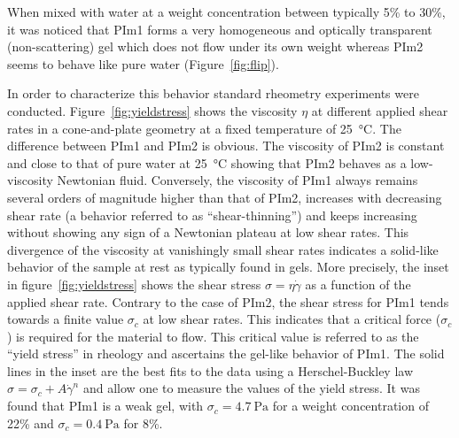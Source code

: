\documentclass[prl,a4paper,twocolumn,superscriptaddress,showkeys]{revtex4}
\begin{document}
When mixed with water at a weight concentration between typically 5\% to 30\%, it was noticed that PIm1 forms a very homogeneous and optically transparent (non-scattering) gel which does not flow under its own weight whereas PIm2 seems to behave like pure water (Figure~\ref{fig:flip}).

In order to characterize this behavior standard rheometry experiments were conducted. Figure~\ref{fig:yieldstress} shows the viscosity $\eta$ at different applied shear rates  in a cone-and-plate geometry at a fixed temperature of \SI{25}{\celsius}\cite{Macosko1994}. The difference between PIm1 and PIm2 is obvious. The viscosity of PIm2 is constant and close to that of pure water at \SI{25}{\celsius} showing that PIm2 behaves as a low-viscosity Newtonian fluid. Conversely, the viscosity of PIm1 always remains several orders of magnitude higher than that of PIm2, increases with decreasing shear rate (a behavior referred to as ``shear-thinning'') and keeps increasing without showing any sign of a Newtonian plateau at low shear rates. This divergence of the viscosity at vanishingly small shear rates indicates a solid-like behavior of the sample at rest as typically found in gels. More precisely, the inset in figure~\ref{fig:yieldstress} shows the shear stress $\sigma=\eta\dot{\gamma}$ as a function of the applied shear rate. Contrary to the case of PIm2, the shear stress for PIm1 tends towards a finite value $\sigma_c$ at low shear rates. This indicates that a critical force ($\sigma_c$) is required for the material to flow. This critical value is referred to as the ``yield stress'' in rheology\cite{Barnes1999} and ascertains the gel-like behavior of PIm1. The solid lines in the inset are the best fits to the data using a Herschel-Buckley law $\sigma = \sigma_c + A\dot{\gamma}^n$ and allow one to measure the values of the yield stress. It was found that PIm1 is a weak gel, with $\sigma_c = \SI{4.7}{\pascal}$ for a weight concentration of 22\% and $\sigma_c = \SI{0.4}{\pascal}$ for 8\%. 
\end{document}
